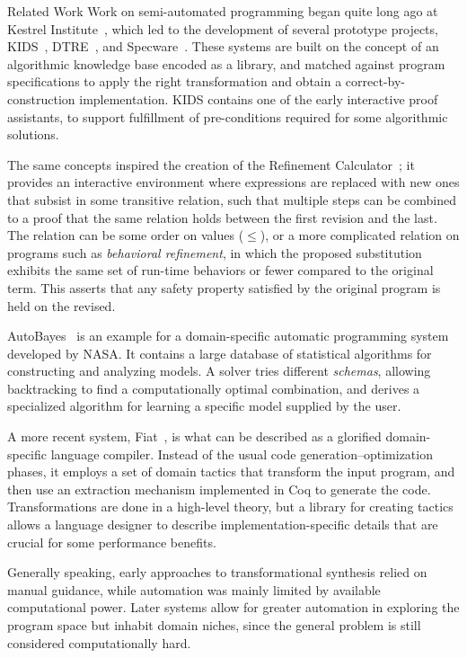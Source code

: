 \begin{paragraph}{Related Work}
Work on semi-automated programming began quite long ago at Kestrel Institute~\cite{AI1985/Smith},
which led to the development of several prototype projects,
KIDS~\cite{TSE1990/Smith}, DTRE~\cite{CPS1991/Blaine}, 
and Specware~\cite{2001/McDonald:specware}.
These systems are built on the concept of an algorithmic knowledge base encoded
as a library, and matched against program specifications to apply the
right transformation and obtain a correct-by-construction implementation.
KIDS contains one of the early interactive proof assistants, to support
fulfillment of pre-conditions required for some algorithmic solutions.

The same concepts inspired the creation of the Refinement Calculator~\cite{TPHOLs1996/Butler};
it provides an interactive environment where expressions are replaced with
new ones that subsist in some transitive relation, such that multiple steps
can be combined to a proof that the same relation holds between the first
revision and the last.
The relation can be some order on values ($\leq$), or a more complicated relation
on programs such as \emph{behavioral refinement}, in which the proposed substitution
exhibits the same set of run-time behaviors or fewer compared to the original
term.
This asserts that any safety property satisfied by the original program is held
on the revised.

AutoBayes~\cite{JFP2003/Fischer} is an example for a domain-specific automatic programming system
developed by NASA.
It contains a large database of statistical algorithms for constructing and
analyzing models.
A solver tries different \emph{schemas}, allowing backtracking to find
a computationally optimal combination, and derives a specialized algorithm
for learning a specific model supplied by the user.

A more recent system, Fiat~\cite{POPL2015/Delaware}, is what can be described
as a glorified domain-specific language compiler.
Instead of the usual code generation--optimization phases, it employs a set
of domain tactics that transform the input program, and then use an extraction
mechanism implemented in Coq to generate the code.
Transformations are done in a high-level theory, but a library for creating
tactics allows a language designer to describe implementation-specific details
that are crucial for some performance benefits.

Generally speaking, early approaches to transformational synthesis relied on
manual guidance, while automation was mainly limited by available computational
power. Later systems allow for greater automation in exploring the program space
but inhabit domain niches, since the general problem is still considered computationally hard.


\end{paragraph}
